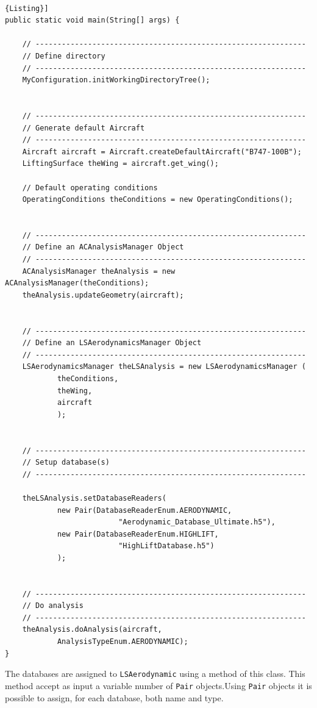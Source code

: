 \noindent \\
\begin{lstlisting}[frame=rbl,caption={{\footnotesize Assign database using an Aircraft object}},label= [style=\bfseries]{Listing}]
public static void main(String[] args) {

	// --------------------------------------------------------------
	// Define directory
	// --------------------------------------------------------------
	MyConfiguration.initWorkingDirectoryTree();


	// --------------------------------------------------------------
	// Generate default Aircraft
	// --------------------------------------------------------------
	Aircraft aircraft = Aircraft.createDefaultAircraft("B747-100B");
	LiftingSurface theWing = aircraft.get_wing();

	// Default operating conditions
	OperatingConditions theConditions = new OperatingConditions();		


	// --------------------------------------------------------------
	// Define an ACAnalysisManager Object
	// --------------------------------------------------------------
	ACAnalysisManager theAnalysis = new ACAnalysisManager(theConditions);
	theAnalysis.updateGeometry(aircraft);


	// --------------------------------------------------------------
	// Define an LSAerodynamicsManager Object
	// --------------------------------------------------------------
	LSAerodynamicsManager theLSAnalysis = new LSAerodynamicsManager ( 
			theConditions,
			theWing,
			aircraft
			);

		
	// --------------------------------------------------------------
	// Setup database(s)	
	// --------------------------------------------------------------
		
	theLSAnalysis.setDatabaseReaders(
			new Pair(DatabaseReaderEnum.AERODYNAMIC,
                          "Aerodynamic_Database_Ultimate.h5"),
			new Pair(DatabaseReaderEnum.HIGHLIFT,  
                          "HighLiftDatabase.h5")
			);

	
	// --------------------------------------------------------------
	// Do analysis
	// --------------------------------------------------------------
	theAnalysis.doAnalysis(aircraft, 
			AnalysisTypeEnum.AERODYNAMIC);
}
\end{lstlisting}
The databases are assigned to \texttt{LSAerodynamic} using a method of this class. This method accept as input a variable number of \texttt{Pair} objects.Using \texttt{Pair} objects it is possible to assign, for each database, both name and type. 

